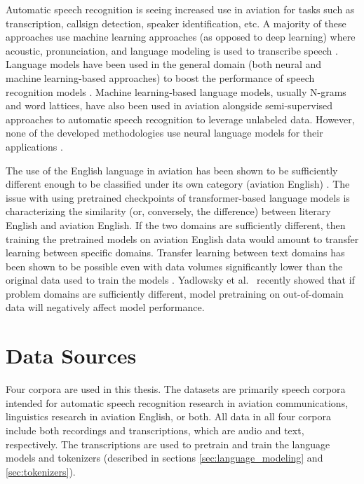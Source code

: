 \documentclass[12pt]{article}
\begin{document}
Automatic speech recognition is seeing increased use in aviation for tasks such as transcription, callsign detection, speaker identification, etc. A majority of these approaches use machine learning approaches (as opposed to deep learning) where acoustic, pronunciation, and language modeling is used to transcribe speech \cite{guo_comparative_2022,smidl_air_2019,zuluaga gomez_automatic_2020,badrinath_automatic_2022,hofbauer_atcosim_2008,helmke_quantifying_2017}. Language models have been used in the general domain (both neural and machine learning-based approaches) to boost the performance of speech recognition models \cite{han_contextnet_2020,kriman_quartznet_2020,majumdar_citrinet_2021}. Machine learning-based language models, usually N-grams and word lattices, have also been used in aviation alongside semi-supervised approaches to automatic speech recognition to leverage unlabeled data. However, none of the developed methodologies use neural language models for their applications \cite{zuluaga-gomez_contextual_2021,srinivasamurthy_semi supervised_2017,badrinath_automatic_2022}.

The use of the English language in aviation has been shown to be sufficiently different enough to be classified under its own category (aviation English) \cite{paltridge_handbook_2013}. The issue with using pretrained checkpoints of transformer-based language models is characterizing the similarity (or, conversely, the difference) between literary English and aviation English. If the two domains are sufficiently different, then training the pretrained models on aviation English data would amount to transfer learning between specific domains. Transfer learning between text domains has been shown to be possible even with data volumes significantly lower than the original data used to train the models \cite{raffel_exploring_2020}. Yadlowsky et al.~\cite{yadlowsky_pretraining_2023} recently showed that if problem domains are sufficiently different, model pretraining on out-of-domain data will negatively affect model performance.

\section{Data Sources}\label{sec:data_source}
Four corpora are used in this thesis. The datasets are primarily speech corpora intended for automatic speech recognition research in aviation communications, linguistics research in aviation English, or both. All data in all four corpora include both recordings and transcriptions, which are audio and text, respectively. The transcriptions are used to pretrain and train the language models and tokenizers (described in sections \ref{sec:language_modeling} and \ref{sec:tokenizers}).
\end{document}
